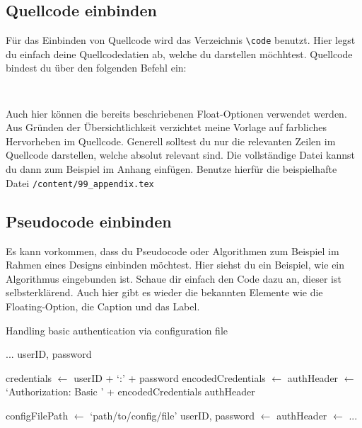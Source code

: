 \subsection{Quellcode einbinden}
Für das Einbinden von Quellcode wird das Verzeichnis \verb|\code| benutzt.
Hier legst du einfach deine Quellcodedatien ab, welche du darstellen möchhtest.
Quellcode bindest du über den folgenden Befehl ein:
\begin{verbatim}
    
\end{verbatim}\noindent
Auch hier können die bereits beschriebenen Float-Optionen verwendet werden.
Aus Gründen der Übersichtlichkeit verzichtet meine Vorlage auf farbliches Hervorheben im Quellcode.
Generell solltest du nur die relevanten Zeilen im Quellcode darstellen, welche absolut relevant sind.
Die vollständige Datei kannst du dann zum Beispiel im Anhang einfügen.
Benutze hierfür die beispielhafte Datei \verb|/content/99_appendix.tex|




\subsection{Pseudocode einbinden}
Es kann vorkommen, dass du Pseudocode oder Algorithmen zum Beispiel im Rahmen eines Designs einbinden möchtest.
Hier siehst du ein Beispiel, wie ein Algorithmus eingebunden ist.
Schaue dir einfach den Code dazu an, dieser ist selbsterklärend.
Auch hier gibt es wieder die bekannten Elemente wie die Floating-Option, die Caption und das Label.
\begin{algorithm}[h]
    \caption{Handling basic authentication via configuration file}
    \label{pseudo:bla}
    \begin{algorithmic}[1]
        \State...
        \State \Return userID, password
        \EndFunction

        \State credentials $\leftarrow$ userID + `:' + password
        \State encodedCredentials $\leftarrow$ 
        \State authHeader $\leftarrow$ `Authorization: Basic ' + encodedCredentials
        \State \Return authHeader
        \EndFunction

        \vspace{3pt}
        \State configFilePath $\leftarrow$ `path/to/config/file'
        \State userID, password $\leftarrow$ 
        \State authHeader $\leftarrow$ 
        \State ...
    \end{algorithmic}
\end{algorithm}


